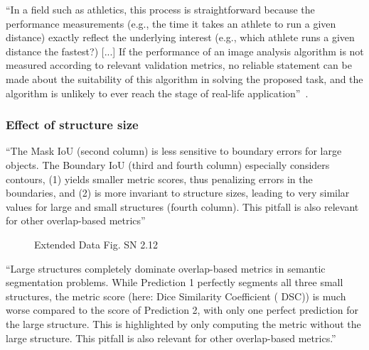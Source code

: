 \documentclass[11pt]{article}
\begin{document}
``In a field such as athletics, this process is straightforward because the performance measurements (e.g., the time it takes an athlete to run a given distance) exactly reflect the underlying interest (e.g., which athlete runs a given distance the fastest?) [...] If the performance of an image analysis algorithm is not measured according to relevant validation metrics, no reliable statement can be made about the suitability of this algorithm in solving the proposed task, and the algorithm is unlikely to ever reach the stage of real-life application''~\cite{pitfalls-in-segmentation-evaluation}. 

\subsubsection{Effect of structure size}

``The Mask IoU (second column) is less sensitive to boundary errors for large objects. The Boundary IoU (third and fourth column) especially considers contours, (1) yields smaller metric scores, thus penalizing errors in the boundaries, and (2) is more invariant to structure sizes, leading to very similar values for large and small structures (fourth column). This pitfall is also relevant for other overlap-based metrics''~\cite{pitfalls-in-segmentation-evaluation}

\begin{figure}[H]
    \centering
    \caption{Extended Data Fig. SN 2.12~\cite{pitfalls-in-segmentation-evaluation}}
\end{figure}

``Large structures completely dominate overlap-based metrics in semantic segmentation problems. While Prediction 1 perfectly segments all three small structures, the metric score (here: Dice Similarity Coefficient ( DSC)) is much worse compared to the score of Prediction 2, with only one perfect prediction for the large structure. This is highlighted by only computing the metric without the large structure. This pitfall is also relevant for other overlap-based metrics.''~\cite{pitfalls-in-segmentation-evaluation}
\end{document}
